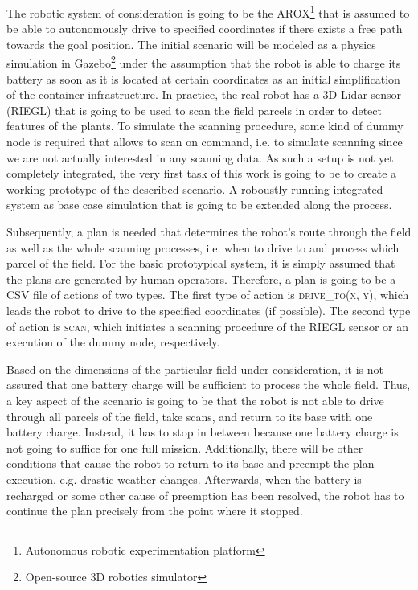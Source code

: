 \documentclass[german, master, expose, latin1]{base/thesis_KBS}
\begin{document}
The robotic system of consideration is going to be the AROX\footnote{Autonomous robotic experimentation platform} that is assumed to be able to autonomously drive to specified
coordinates if there exists a free path towards the goal position. The initial scenario will be modeled as a physics simulation in Gazebo\footnote{Open-source 3D robotics simulator} 
under the assumption that the robot is able to charge its battery as soon as it is located at certain coordinates as an initial simplification of the container infrastructure.
In practice, the real robot has a 3D-Lidar sensor (RIEGL) that is going to be used to scan the field parcels in order to detect features of the plants.
To simulate the scanning procedure, some kind of dummy node is required that allows to scan on command, i.e. to simulate scanning since we are not actually
interested in any scanning data. As such a setup is not yet completely integrated, the very first task of this work is going to be to create a working prototype of
the described scenario. A roboustly running integrated system as base case simulation that is going to be extended along the process.\newline

Subsequently, a plan is needed that determines the robot's route through the field as well as the whole scanning processes, i.e. when to drive to and process which parcel of the field.
For the basic prototypical system, it is simply assumed that the plans are generated by human operators. Therefore, a plan is going to be a CSV file of actions of two types.
The first type of action is \textsc{drive\_to(x, y)}, which leads the robot to drive to the specified coordinates (if possible). The second type of action is \textsc{scan},
which initiates a scanning procedure of the RIEGL sensor or an execution of the dummy node, respectively.\newline

Based on the dimensions of the particular field under consideration, it is not assured that one battery charge will be sufficient to process the whole field.
Thus, a key aspect of the scenario is going to be that the robot is not able to drive through all parcels of the field, take scans, and return to its base with one battery charge.
Instead, it has to stop in between because one battery charge is not going to suffice for one full mission. Additionally, there will be other conditions that cause
the robot to return to its base and preempt the plan execution, e.g. drastic weather changes. Afterwards, when the battery is recharged or some other cause of preemption
has been resolved, the robot has to continue the plan precisely from the point where it stopped.\newline
\end{document}
